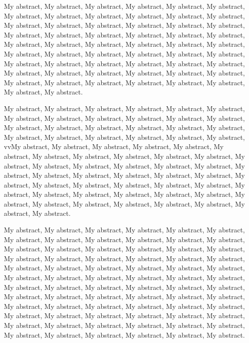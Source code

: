 \label{sec:abstract}

My abstract, My abstract, My abstract, My abstract, My abstract, My abstract, My abstract, My abstract, My abstract, My abstract, My abstract, My abstract, My abstract, My abstract, My abstract, My abstract, My abstract, My abstract, My abstract, My abstract, My abstract, My abstract, My abstract, My abstract, My abstract, My abstract, My abstract, My abstract, My abstract, My abstract, My abstract, My abstract, My abstract, My abstract, My abstract, My abstract, My abstract, My abstract, My abstract, My abstract, My abstract, My abstract, My abstract, My abstract, My abstract, My abstract, My abstract, My abstract, My abstract, My abstract, My abstract, My abstract, My abstract, My abstract, My abstract, My abstract.

My abstract, My abstract, My abstract, My abstract, My abstract, My abstract, My abstract, My abstract, My abstract, My abstract, My abstract, My abstract, My abstract, My abstract, My abstract, My abstract, My abstract, My abstract, My abstract, My abstract, My abstract, My abstract, My abstract, My abstract, vvMy abstract, My abstract, My abstract, My abstract, My abstract, My abstract, My abstract, My abstract, My abstract, My abstract, My abstract, My abstract, My abstract, My abstract, My abstract, My abstract, My abstract, My abstract, My abstract, My abstract, My abstract, My abstract, My abstract, My abstract, My abstract, My abstract, My abstract, My abstract, My abstract, My abstract, My abstract, My abstract, My abstract, My abstract, My abstract, My abstract, My abstract, My abstract, My abstract, My abstract, My abstract, My abstract, My abstract.

My abstract, My abstract, My abstract, My abstract, My abstract, My abstract, My abstract, My abstract, My abstract, My abstract, My abstract, My abstract, My abstract, My abstract, My abstract, My abstract, My abstract, My abstract, My abstract, My abstract, My abstract, My abstract, My abstract, My abstract, My abstract, My abstract, My abstract, My abstract, My abstract, My abstract, My abstract, My abstract, My abstract, My abstract, My abstract, My abstract, My abstract, My abstract, My abstract, My abstract, My abstract, My abstract, My abstract, My abstract, My abstract, My abstract, My abstract, My abstract, My abstract, My abstract, My abstract, My abstract, My abstract, My abstract, My abstract, My abstract, My abstract, My abstract, My abstract, My abstract, My abstract, My abstract, My abstract, My abstract, My abstract, My abstract, My abstract, My abstract, My abstract, My abstract, My abstract, My abstract.